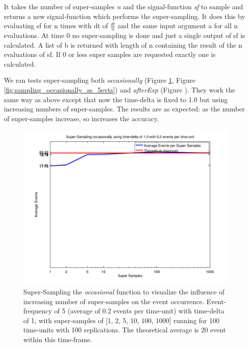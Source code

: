It takes the number of super-samples \textit{n} and the signal-function \textit{sf} to sample and returns a new signal-function which performs the super-sampling. It does this by evaluating sf for n times with dt of $\frac{dt}{n}$ and the same input argument a for all n evaluations. At time 0 no super-sampling is done and just a single output of sf is calculated. A list of b is returned with length of n containing the result of the n evaluations of sf. If 0 or less super samples are requested exactly one is calculated.

We ran tests super-sampling both \textit{occasionally} (Figure \ref{fig:sampling_occasionally_ss_02evts}, Figure \ref{fig:sampling_occasionally_ss_5evts}) and \textit{afterExp} (Figure ). They work the same way as above except that now the time-delta is fixed to 1.0 but using increasing numbers of super-samples. The results are as expected: as the number of super-samples increase, so increases the accuracy.

\begin{figure}
	\centering
	\includegraphics[width=.6\textwidth, angle=0]{./../shared/fig/samplingTest_occasionally_ss_02evts.png}
	\caption{Super-Sampling the \textit{occasional} function to visualize the influence of increasing number of super-samples on the event occurrence. Event-frequency of 5 (average of 0.2 events per time-unit) with time-delta of 1, with super-samples of [1, 2, 5, 10, 100, 1000] running for 100 time-units with 100 replications. The theoretical average is 20 event within this time-frame.}
	\label{fig:sampling_occasionally_ss_02evts}
\end{figure}

